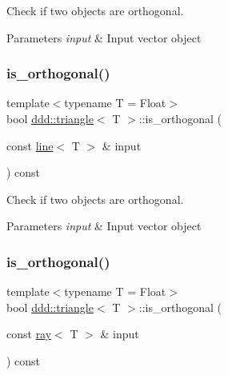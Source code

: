 Check if two objects are orthogonal. 


\begin{DoxyParams}{Parameters}
{\em input} & Input vector object \\
\hline
\end{DoxyParams}
\mbox{\label{classddd_1_1triangle_a69185916f0406188b4dbb7890d75ef65}} 
\subsubsection{\texorpdfstring{is\+\_\+orthogonal()}{is\_orthogonal()}\hspace{0.1cm}{\footnotesize\ttfamily [2/5]}}
{\footnotesize\ttfamily template$<$typename T = Float$>$ \\
bool \hyperlink{classddd_1_1triangle}{ddd\+::triangle}$<$ T $>$\+::is\+\_\+orthogonal (\begin{DoxyParamCaption}\item[{const \hyperlink{classddd_1_1line}{line}$<$ T $>$ \&}]{input }\end{DoxyParamCaption}) const\hspace{0.3cm}{\ttfamily [inline]}}



Check if two objects are orthogonal. 


\begin{DoxyParams}{Parameters}
{\em input} & Input vector object \\
\hline
\end{DoxyParams}
\mbox{\label{classddd_1_1triangle_ac0a2b1a3f58cee686599c681bb955d92}} 
\subsubsection{\texorpdfstring{is\+\_\+orthogonal()}{is\_orthogonal()}\hspace{0.1cm}{\footnotesize\ttfamily [3/5]}}
{\footnotesize\ttfamily template$<$typename T = Float$>$ \\
bool \hyperlink{classddd_1_1triangle}{ddd\+::triangle}$<$ T $>$\+::is\+\_\+orthogonal (\begin{DoxyParamCaption}\item[{const \hyperlink{classddd_1_1ray}{ray}$<$ T $>$ \&}]{input }\end{DoxyParamCaption}) const\hspace{0.3cm}{\ttfamily [inline]}}



